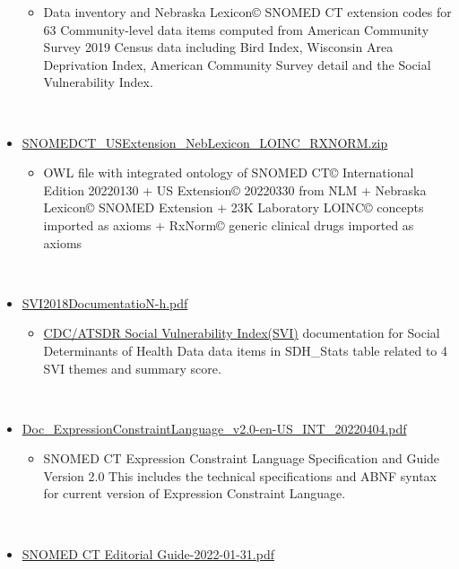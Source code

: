 \documentclass[
]{journal}
\providecommand{\tightlist}{%
  \setlength{\itemsep}{0pt}\setlength{\parskip}{0pt}}
\begin{document}
\begin{itemize}
  \begin{itemize}
  \tightlist
  \item
    Data inventory and Nebraska Lexicon© SNOMED CT extension codes for 63 Community-level data items computed from American Community Survey 2019 Census data including Bird Index, Wisconsin Area Deprivation Index, American Community Survey detail and the Social Vulnerability Index.\\
    \strut \\
  \end{itemize}
\item
  \href{https://github.com/UNMC-CRANE/AMIA_Workshop_May_2022/blob/main/Handouts/SNOMEDCT_USExtension_NebLexicon_LOINC_RxNorm_20220426.zip}{SNOMEDCT\_USExtension\_NebLexicon\_LOINC\_RXNORM.zip}

  \begin{itemize}
  \tightlist
  \item
    OWL file with integrated ontology of SNOMED CT© International Edition 20220130 + US Extension© 20220330 from NLM + Nebraska Lexicon© SNOMED Extension + 23K Laboratory LOINC© concepts imported as axioms + RxNorm© generic clinical drugs imported as axioms\\
    \strut \\
  \end{itemize}
\item
  \href{https://github.com/UNMC-CRANE/AMIA_Workshop_May_2022/blob/main/Handouts/SVI2018Documentation-H.pdf}{SVI2018DocumentatioN-h.pdf}

  \begin{itemize}
  \tightlist
  \item
    \href{https:/atsdr.cdc.gov/placeandhealth/svi/index.html}{CDC/ATSDR Social Vulnerability Index(SVI)} documentation for Social Determinants of Health Data data items in SDH\_Stats table related to 4 SVI themes and summary score.\\
    \strut \\
  \end{itemize}
\item
  \href{https://github.com/UNMC-CRANE/AMIA_Workshop_May_2022/blob/main/Handouts/doc_ExpressionConstraintLanguage_v2.0-en-US_INT_20220404.pdf}{Doc\_ExpressionConstraintLanguage\_v2.0-en-US\_INT\_20220404.pdf}

  \begin{itemize}
  \tightlist
  \item
    SNOMED CT Expression Constraint Language Specification and Guide Version 2.0 This includes the technical specifications and ABNF syntax for current version of Expression Constraint Language.\\
    \strut \\
  \end{itemize}
\item
  \href{https://github.com/UNMC-CRANE/AMIA_Workshop_May_2022/blob/main/Handouts/SNOMED\%20CT\%20Editorial\%20Guide-2022-01-31.pdf}{SNOMED CT Editorial Guide-2022-01-31.pdf}


\end{itemize}
\end{document}
